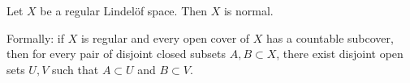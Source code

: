 Let $X$ be a regular Lindelöf space. Then $X$ is normal.

Formally: if $X$ is regular and every open cover of $X$ has a countable subcover, then for every pair of disjoint closed subsets $A, B \subset X$, there exist disjoint open sets $U, V$ such that $A \subset U$ and $B \subset V$.
